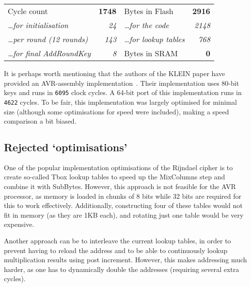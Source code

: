 \documentclass[a4paper]{article}
\begin{document}
\vspace{0.5em}
\begin{center}
	\begin{tabular}{l r | l r}
		\hline
		Cycle count & \textbf{1748} & Bytes in Flash & \textbf{2916} \\
		\hspace{1em} \emph{\dots for initialisation} & \emph{24} & \hspace{1em} \emph{\dots for the code} & \emph{2148} \\
		\hspace{1em} \emph{\dots per round (12 rounds)} & \emph{143} & \hspace{1em} \emph{\dots for lookup tables} & \emph{768} \\
		\cline{3-4}
		\hspace{1em} \emph{\dots for final AddRoundKey} & \emph{8} & Bytes in SRAM & \textbf{0} \\
		\hline
	\end{tabular}
\end{center}
\vspace{0.5em}

It is perhaps worth mentioning that the authors of the KLEIN paper have provided an AVR-assembly implementation~\cite{eisenbarth2012compact}. Their implementation uses 80-bit keys and runs in \texttt{6095} clock cycles. A 64-bit port of this implementation runs in \texttt{4622} cycles. To be fair, this implementation was largely optimised for minimal size (although some optimisations for speed were included), making a speed comparison a bit biased.

\subsection*{Rejected `optimisations'}

One of the popular implementation optimisations of the Rijndael cipher is to create so-called Tbox lookup tables to speed up the MixColumns step and combine it with SubBytes. However, this approach is not feasible for the AVR processor, as memory is loaded in chunks of 8 bits while 32 bits are required for this to work effectively. Additionally, constructing four of these tables would not fit in memory (as they are 1KB each), and rotating just one table would be very expensive.

Another approach can be to interleave the current lookup tables, in order to prevent having to reload the address and to be able to continuously lookup multiplication results using post increment. However, this makes addressing much harder, as one has to dynamically double the addresses (requiring several extra cycles).




\end{document}
